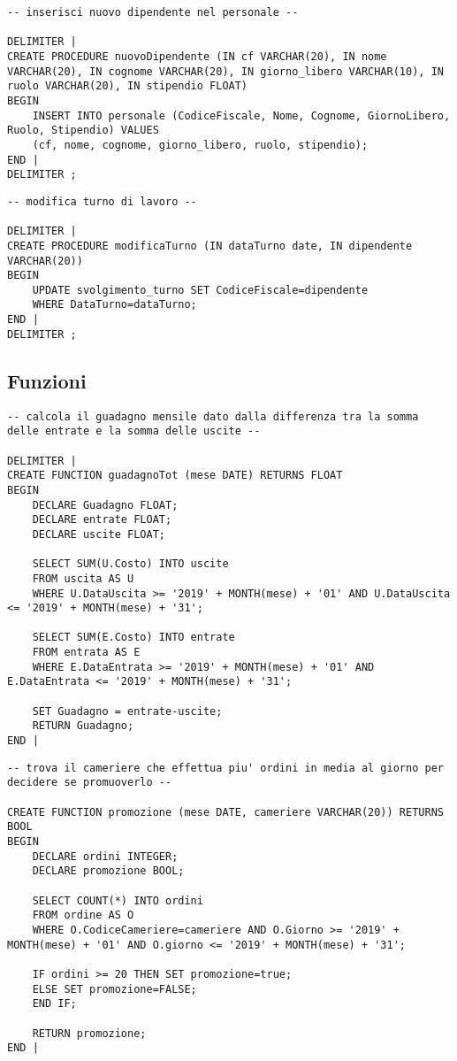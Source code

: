 \begin{lstlisting}[title=Operazione 5, style=mysqlStyle]
-- inserisci nuovo dipendente nel personale --

DELIMITER |
CREATE PROCEDURE nuovoDipendente (IN cf VARCHAR(20), IN nome VARCHAR(20), IN cognome VARCHAR(20), IN giorno_libero VARCHAR(10), IN ruolo VARCHAR(20), IN stipendio FLOAT)
BEGIN
    INSERT INTO personale (CodiceFiscale, Nome, Cognome, GiornoLibero, Ruolo, Stipendio) VALUES
    (cf, nome, cognome, giorno_libero, ruolo, stipendio);
END |
DELIMITER ;
\end{lstlisting}

\begin{lstlisting}[title=Operazione 6, style=mysqlStyle]
-- modifica turno di lavoro --

DELIMITER |
CREATE PROCEDURE modificaTurno (IN dataTurno date, IN dipendente VARCHAR(20))
BEGIN
    UPDATE svolgimento_turno SET CodiceFiscale=dipendente
    WHERE DataTurno=dataTurno;
END |
DELIMITER ;
\end{lstlisting}

\subsection{Funzioni} %
\begin{lstlisting}[title=Operazione 11, style=mysqlStyle]
-- calcola il guadagno mensile dato dalla differenza tra la somma delle entrate e la somma delle uscite --

DELIMITER |
CREATE FUNCTION guadagnoTot (mese DATE) RETURNS FLOAT
BEGIN 
    DECLARE Guadagno FLOAT;
    DECLARE entrate FLOAT;
    DECLARE uscite FLOAT;
    
    SELECT SUM(U.Costo) INTO uscite
    FROM uscita AS U
    WHERE U.DataUscita >= '2019' + MONTH(mese) + '01' AND U.DataUscita <= '2019' + MONTH(mese) + '31';
    
    SELECT SUM(E.Costo) INTO entrate 
    FROM entrata AS E
    WHERE E.DataEntrata >= '2019' + MONTH(mese) + '01' AND E.DataEntrata <= '2019' + MONTH(mese) + '31';
    
    SET Guadagno = entrate-uscite;
    RETURN Guadagno;
END |
\end{lstlisting}

\begin{lstlisting}[title=Operazione 12, style=mysqlStyle]
-- trova il cameriere che effettua piu' ordini in media al giorno per decidere se promuoverlo --

CREATE FUNCTION promozione (mese DATE, cameriere VARCHAR(20)) RETURNS BOOL
BEGIN
    DECLARE ordini INTEGER;
    DECLARE promozione BOOL;
    
    SELECT COUNT(*) INTO ordini
    FROM ordine AS O
    WHERE O.CodiceCameriere=cameriere AND O.Giorno >= '2019' + MONTH(mese) + '01' AND O.giorno <= '2019' + MONTH(mese) + '31';
    
    IF ordini >= 20 THEN SET promozione=true;
    ELSE SET promozione=FALSE;
    END IF;
    
    RETURN promozione;
END |
\end{lstlisting}

